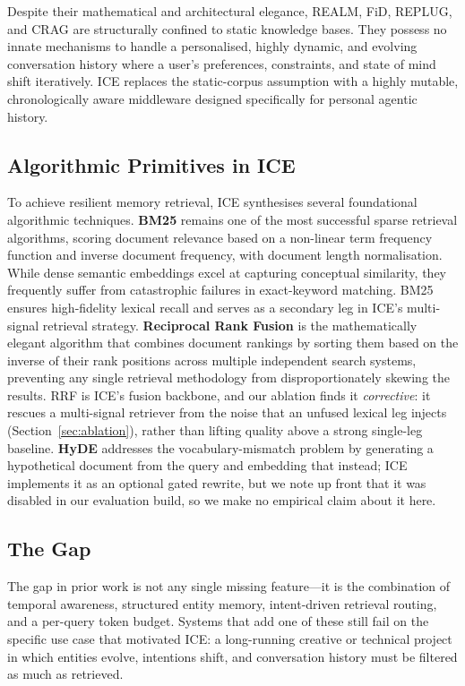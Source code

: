 \documentclass[10pt]{article}
\begin{document}
Despite their mathematical and architectural elegance, REALM, FiD, REPLUG, and CRAG are structurally confined to static knowledge bases. They possess no innate mechanisms to handle a personalised, highly dynamic, and evolving conversation history where a user's preferences, constraints, and state of mind shift iteratively. ICE replaces the static-corpus assumption with a highly mutable, chronologically aware middleware designed specifically for personal agentic history.

\subsection{Algorithmic Primitives in ICE}

To achieve resilient memory retrieval, ICE synthesises several foundational algorithmic techniques. \textbf{BM25} \citep{robertson2009bm25} remains one of the most successful sparse retrieval algorithms, scoring document relevance based on a non-linear term frequency function and inverse document frequency, with document length normalisation. While dense semantic embeddings excel at capturing conceptual similarity, they frequently suffer from catastrophic failures in exact-keyword matching. BM25 ensures high-fidelity lexical recall and serves as a secondary leg in ICE's multi-signal retrieval strategy. \textbf{Reciprocal Rank Fusion} \citep{cormack2009rrf} is the mathematically elegant algorithm that combines document rankings by sorting them based on the inverse of their rank positions across multiple independent search systems, preventing any single retrieval methodology from disproportionately skewing the results. RRF is ICE's fusion backbone, and our ablation finds it \emph{corrective}: it rescues a multi-signal retriever from the noise that an unfused lexical leg injects (Section~\ref{sec:ablation}), rather than lifting quality above a strong single-leg baseline. \textbf{HyDE} \citep{gao2023hyde} addresses the vocabulary-mismatch problem by generating a hypothetical document from the query and embedding that instead; ICE implements it as an optional gated rewrite, but we note up front that it was disabled in our evaluation build, so we make no empirical claim about it here.

\subsection{The Gap}

The gap in prior work is not any single missing feature---it is the combination of temporal awareness, structured entity memory, intent-driven retrieval routing, and a per-query token budget. Systems that add one of these still fail on the specific use case that motivated ICE: a long-running creative or technical project in which entities evolve, intentions shift, and conversation history must be filtered as much as retrieved.
\end{document}

